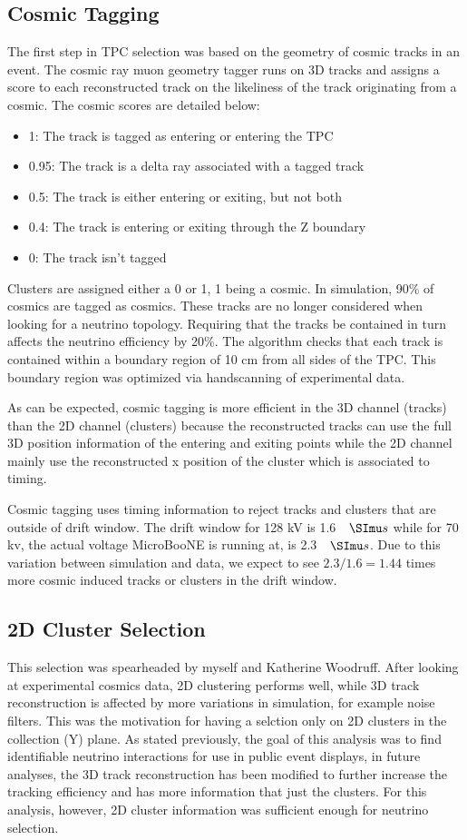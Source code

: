 \subsection{Cosmic Tagging}
The first step in TPC selection was based on the geometry of cosmic tracks in an event. The cosmic ray muon geometry tagger runs on 3D tracks and assigns a score to each reconstructed track on the likeliness of the track originating from a cosmic. The cosmic scores are detailed below:
\begin{itemize}
\item 1: The track is tagged as entering or entering the TPC
\item 0.95: The track is a delta ray associated with a tagged track
\item 0.5: The track is either entering or exiting, but not both
\item 0.4: The track is entering or exiting through the Z boundary
\item 0: The track isn't tagged
\end{itemize}
Clusters are assigned either a 0 or 1, 1 being a cosmic. In simulation, 90\% of cosmics are tagged as cosmics. These tracks are no longer considered when looking for a neutrino topology. Requiring that the tracks be contained in turn affects the neutrino efficiency by 20\%. The algorithm checks that each track is contained within a boundary region of 10 cm from all sides of the TPC. This boundary region was optimized via handscanning of experimental data.

As can be expected, cosmic tagging is more efficient in the 3D channel (tracks) than the 2D channel (clusters) because the reconstructed tracks can use the full 3D position information of the entering and exiting points while the 2D channel mainly use the reconstructed x position of the cluster which is associated to timing. 

Cosmic tagging uses timing information to reject tracks and clusters that are outside of drift window. The drift window for 128 kV is 1.6 $\micro s$ while for 70 kv, the actual voltage MicroBooNE is running at, is 2.3 $\micro s$. Due to this variation between simulation and data, we expect to see $2.3/1.6 = 1.44$ times more cosmic induced tracks or clusters in the drift window. 
\subsection{2D Cluster Selection}
This selection was spearheaded by myself and Katherine Woodruff. After looking at experimental cosmics data, 2D clustering performs well, while 3D track reconstruction is affected by more variations in simulation, for example noise filters. This was the motivation for having a selction only on 2D clusters in the collection (Y) plane. As stated previously, the goal of this analysis was to find identifiable neutrino interactions for use in public event displays, in future analyses, the 3D track reconstruction has been modified to further increase the tracking efficiency and has more information that just the clusters. For this analysis, however, 2D cluster information was sufficient enough for neutrino selection. 
